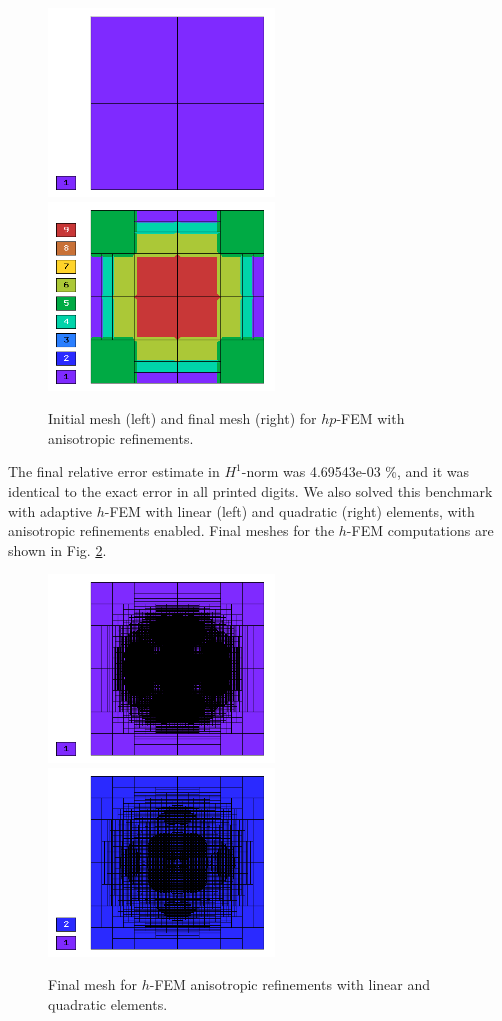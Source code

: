 \begin{figure}[!ht]
\centering
\includegraphics[height=5cm]{nist/nist-1/mesh_hp_aniso_init.png}\ \
\includegraphics[height=5cm]{nist/nist-1/mesh_hp_aniso.png}
\caption{Initial mesh (left) and final mesh (right) for $hp$-FEM with anisotropic refinements.}
\label{fig:nist-1-hp-aniso}
\end{figure}

The final relative error estimate in $H^1$-norm was 4.69543e-03 \%,
and it was identical to the exact error in all printed digits.
We also solved this benchmark with adaptive $h$-FEM
with linear (left) and quadratic (right)
elements, with anisotropic refinements enabled.
Final meshes for the $h$-FEM computations are shown
in Fig. \ref{fig:nist-1-h-aniso}.

\begin{figure}[!ht]
\centering
\includegraphics[height=5cm]{nist/nist-1/mesh_h1_aniso.png}\ \
\includegraphics[height=5cm]{nist/nist-1/mesh_h2_aniso.png}
\caption{Final mesh for $h$-FEM anisotropic refinements with linear and quadratic elements.}
\label{fig:nist-1-h-aniso}
\end{figure}

